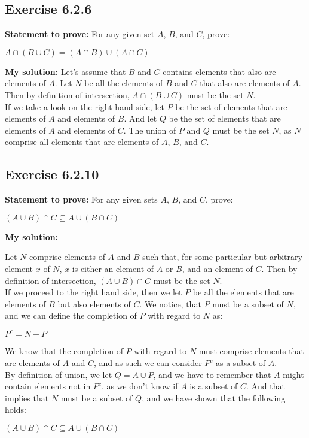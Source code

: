 \documentclass{article}
\newcommand{\cent}[1]{\begin{center}#1\end{center}}
\newcommand{\Prove}{\textbf{Statement to prove: }}
\newcommand{\Solution}{\textbf{My solution: }}
\newcommand{\QED}{\boxed{}}
\newcommand{\Exercise}[1]{\subsection*{Exercise #1}}
\begin{document}
	\Exercise{6.2.6}
	
	\Prove
	For any given set $A$, $B$, and $C$, prove:
	
	\cent{$A \cap (B \cup C) = (A \cap B) \cup (A \cap C)$}
	
	\Solution
	Let's assume that $B$ and $C$ contains elements that also are elements of $A$. Let $N$ be all the elements of $B$ and $C$ that also are elements of $A$. Then by definition of intersection, $A \cap (B \cup C)$  must be the set $N$.\\
	
	If we take a look on the right hand side, let $P$ be the set of elements that are elements of $A$ and elements of $B$. And let $Q$ be the set of elements that are elements of $A$ and elements of $C$. The union of $P$ and $Q$ must be the set $N$, as $N$ comprise all elements that are elements of $A$, $B$, and $C$.\\
	\QED
	
	\Exercise{6.2.10}
	
	\Prove
	For any given sets $A$, $B$, and $C$, prove:
	
	\cent{$(A \cup B) \cap C \subseteq A \cup (B \cap C)$}
	
	\Solution
	
	Let $N$ comprise elements of $A$ and $B$ such that, for some particular but arbitrary element $x$ of $N$, $x$ is either an element of $A$ or $B$, and an element of $C$. Then by definition of intersection, $(A \cup B) \cap C$ must be the set $N$. \\
	
	If we proceed to the right hand side, then we let $P$ be all the elements that are elements of $B$ but also elements of $C$. We notice, that $P$ must  be a subset of $N$, and we can define the completion of $P$ with regard to $N$ as:
	
	\cent{$P^c = N - P$}
	
	We know that the completion of $P$ with regard to $N$ must comprise elements that are elements of $A$ and $C$, and as such we can consider $P^c$ as a subset of $A$.\\
	
	By definition of union, we let $Q = A \cup P$, and we have to remember that $A$ might contain elements not in $P^c$, as we don't know if $A$ is a subset of $C$. And that implies that $N$ must be a subset of $Q$, and we have shown that the following holds:
	
	\cent{$(A \cup B) \cap C \subseteq A \cup (B \cap C)$}
	
\end{document}
